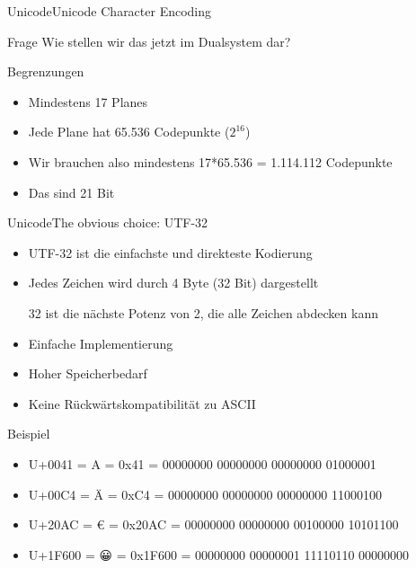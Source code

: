 \documentclass[xelatex,aspectratio=169]{beamer}
\begin{document}
\begin{frame}{Unicode}{Unicode Character Encoding}
    \begin{alertblock}{Frage}
        Wie stellen wir das jetzt im Dualsystem dar?
    \end{alertblock}
    \begin{block}{Begrenzungen}
        \begin{itemize}
            \item Mindestens 17 Planes
            \item Jede Plane hat 65.536 Codepunkte ($2^{16}$)
            \item Wir brauchen also mindestens 17*65.536 = 1.114.112 Codepunkte
            \item Das sind 21 Bit
        \end{itemize}
    \end{block}
\end{frame}

\begin{frame}{Unicode}{The obvious choice: UTF-32}
    \begin{itemize}
        \item UTF-32 ist die einfachste und direkteste Kodierung
        \item Jedes Zeichen wird durch 4 Byte (32 Bit) dargestellt

              32 ist die nächste Potenz von 2, die alle Zeichen abdecken kann
        \item Einfache Implementierung
        \item Hoher Speicherbedarf
        \item Keine Rückwärtskompatibilität zu ASCII
    \end{itemize}
    \begin{block}{Beispiel}
        \begin{itemize}
            \item U+0041 = A = 0x41 = 00000000 00000000 00000000 01000001
            \item U+00C4 = Ä = 0xC4 = 00000000 00000000 00000000 11000100
            \item U+20AC = € = 0x20AC = 00000000 00000000 00100000 10101100
            \item U+1F600 = {\symbolfont 😀} = 0x1F600 = 00000000 00000001 11110110 00000000
        \end{itemize}
    \end{block}
\end{frame}
\end{document}

